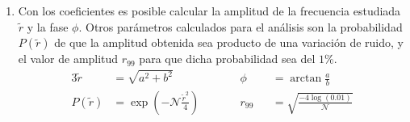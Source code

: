 \begin{enumerate}
        \item Con los coeficientes es posible calcular la amplitud de la frecuencia estudiada $\tilde{r}$ y la fase $\phi$. Otros parámetros calculados para el análisis son la probabilidad $P(\tilde{r})$ de que la amplitud obtenida sea producto de una variación de ruido, y el valor de amplitud $r_{99}$ para que dicha probabilidad sea del $1$\%. 
        \begin{alignat}{3}
            \tilde{r} &= \sqrt{a^2 +b^2}             
            &&\phi&&= \arctan\frac{a}{b}\\
            P(\tilde{r})&= \exp(-\mathcal{N}\frac{\tilde{r}^2}{4}) \qquad
            &&r_{99}&&= \sqrt{\frac{-4\log(0.01)}{\mathcal{N}}}
        \end{alignat}



      \end{enumerate}